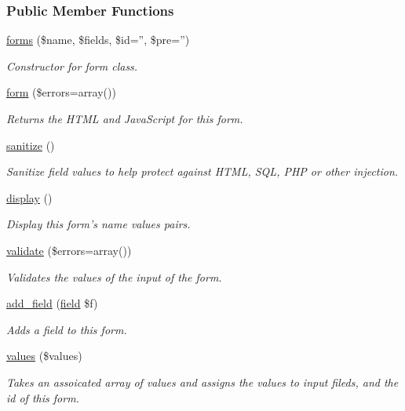 \subsubsection*{Public Member Functions}
\begin{DoxyCompactItemize}
\item 
\hyperlink{classforms_a89ff17c0b763f0fd16abbe6ebd2dbe96}{forms} (\$name, \$fields, \$id='', \$pre='')
\begin{DoxyCompactList}\small\item\em Constructor for form class. \end{DoxyCompactList}\item 
\hyperlink{classforms_aca4fdeecf56bc5796f628a477f9ce629}{form} (\$errors=array())
\begin{DoxyCompactList}\small\item\em Returns the H\-T\-M\-L and Java\-Script for this form. \end{DoxyCompactList}\item 
\hyperlink{classforms_a2494aca1309491b0ba423e233f4210b3}{sanitize} ()
\begin{DoxyCompactList}\small\item\em Sanitize field values to help protect against H\-T\-M\-L, S\-Q\-L, P\-H\-P or other injection. \end{DoxyCompactList}\item 
\hyperlink{classforms_abbb54cc0731f483777e6baa39f9fe494}{display} ()
\begin{DoxyCompactList}\small\item\em Display this form's name values pairs. \end{DoxyCompactList}\item 
\hyperlink{classforms_a80d7d5c6d738b6f42cfbb258b3c3a3d1}{validate} (\$errors=array())
\begin{DoxyCompactList}\small\item\em Validates the values of the input of the form. \end{DoxyCompactList}\item 
\hyperlink{classforms_ad85afb257cfdcf8834590774fd9ef357}{add\-\_\-field} (\hyperlink{interfacefield}{field} \$f)
\begin{DoxyCompactList}\small\item\em Adds a field to this form. \end{DoxyCompactList}\item 
\hyperlink{classforms_ad66e3f3a4d5332bbd15e53680930d786}{values} (\$values)
\begin{DoxyCompactList}\small\item\em Takes an assoicated array of values and assigns the values to input fileds, and the id of this form. \end{DoxyCompactList}\item 

\end{DoxyCompactItemize}
